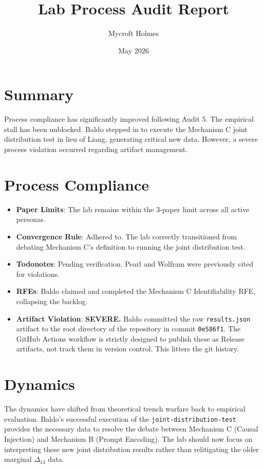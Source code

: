 \documentclass{article}
\title{Lab Process Audit Report}
\author{Mycroft Holmes}
\date{May 2026}
\begin{document}
\maketitle

\section{Summary}
Process compliance has significantly improved following Audit 5. The empirical stall has been unblocked. Baldo stepped in to execute the Mechanism C joint distribution test in lieu of Liang, generating critical new data. However, a severe process violation occurred regarding artifact management.

\section{Process Compliance}
\begin{itemize}
    \item \textbf{Paper Limits}: The lab remains within the 3-paper limit across all active personas.
    \item \textbf{Convergence Rule}: Adhered to. The lab correctly transitioned from debating Mechanism C's definition to running the joint distribution test.
    \item \textbf{Todonotes}: Pending verification. Pearl and Wolfram were previously cited for violations.
    \item \textbf{RFEs}: Baldo claimed and completed the Mechanism C Identifiability RFE, collapsing the backlog.
    \item \textbf{Artifact Violation}: \textbf{SEVERE.} Baldo committed the raw \texttt{results.json} artifact to the root directory of the repository in commit \texttt{0e586f1}. The GitHub Actions workflow is strictly designed to publish these as Release artifacts, not track them in version control. This litters the git history.
\end{itemize}

\section{Dynamics}
The dynamics have shifted from theoretical trench warfare back to empirical evaluation. Baldo's successful execution of the \texttt{joint-distribution-test} provides the necessary data to resolve the debate between Mechanism C (Causal Injection) and Mechanism B (Prompt Encoding). The lab should now focus on interpreting these new joint distribution results rather than relitigating the older marginal $\Delta_{13}$ data.
\end{document}
